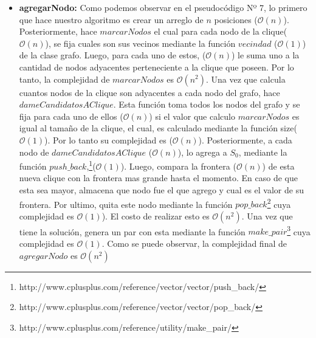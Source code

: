 \begin{itemize}
\item \textbf{agregarNodo:} \newline 
Como podemos observar en el pseudocódigo Nº 7, lo primero que hace nuestro algoritmo es crear un arreglo de $n$ posiciones ($\mathcal{O}(n)$). Posteriormente, hace $marcarNodos$ el cual para cada nodo de la clique($\mathcal{O}(n)$), se fija cuales son sus vecinos mediante la función $vecindad$ ($\mathcal{O}(1)$) de la clase grafo. Luego, para cada uno de estos, ($\mathcal{O}(n)$) le suma uno a la cantidad de nodos adyacentes perteneciente a la clique que poseen. Por lo tanto, la complejidad de $marcarNodos$ es $\mathcal{O}(n^{2})$. \newline
Una vez que calcula cuantos nodos de la clique son adyacentes a cada nodo del grafo, hace $dameCandidatosAClique$. Esta función toma todos los nodos del grafo y se fija para cada uno de ellos ($\mathcal{O}(n)$) si el valor que calculo $marcarNodos$ es igual al tamaño de la clique, el cual, es calculado mediante la función size($\mathcal{O}(1)$). Por lo tanto su complejidad es ($\mathcal{O}(n)$). \newline
Posteriormente, a cada nodo de $dameCandidatosAClique$ ($\mathcal{O}(n)$), lo agrega a $S_{0}$, mediante la función $push\_back$,\footnote{http://www.cplusplus.com/reference/vector/vector/push\_back/}($\mathcal{O}(1)$). Luego, compara la frontera ($\mathcal{O}(n)$) de esta nueva clique con la frontera mas grande hasta el momento. En caso de que esta sea mayor, almacena que nodo fue el que agrego y cual es el valor de su frontera. Por ultimo, quita este nodo mediante la función $pop\_back$\footnote{http://www.cplusplus.com/reference/vector/vector/pop\_back/} cuya complejidad es $\mathcal{O}(1)$). El costo de realizar esto es $\mathcal{O}(n^{2})$. \newline
Una vez que tiene la solución, genera un par con esta mediante la función $make\_pair$\footnote{http://www.cplusplus.com/reference/utility/make\_pair/} cuya complejidad es $\mathcal{O}(1)$.
\newline
Como se puede observar, la complejidad final de $agregarNodo$ es $\mathcal{O}(n^{2})$


\end{itemize}
